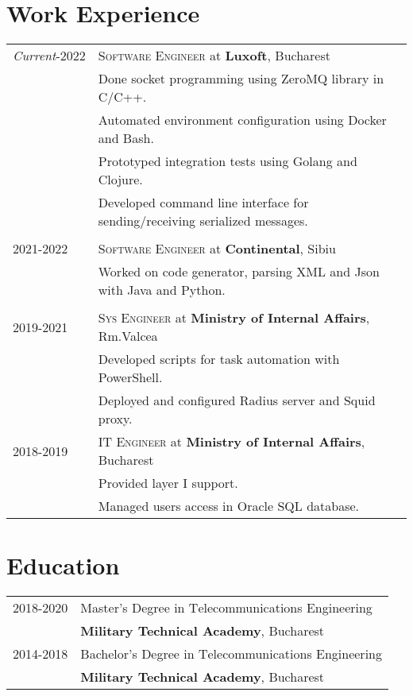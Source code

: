\documentclass[a4paper,12pt]{article}
\newcommand{\tsc}{\textsc}
\begin{document}
\section{Work Experience}
    \begin{tabular}{p{3.1cm}|l}
        \raggedleft\emph{Current}\tsc{-2022}
        &\tsc{Software Engineer} at \textbf{Luxoft}, Bucharest\\
        &\footnotesize{Done socket programming using ZeroMQ library in C/C++.}\\
        &\footnotesize{Automated environment configuration using Docker and Bash.}\\
        &\footnotesize{Prototyped integration tests using Golang and Clojure.}\\
        &\footnotesize{Developed command line interface for sending/receiving serialized messages.}\\
        \multicolumn{2}{c}{}\\
        \raggedleft\tsc{2021-2022}
        &\tsc{Software Engineer} at \textbf{Continental}, Sibiu\\
        &\footnotesize{Worked on code generator, parsing XML and Json with Java and Python.}\\
        \multicolumn{2}{c}{}\\
        \raggedleft\tsc{2019-2021} 
          &\tsc{Sys Engineer} at \textbf{Ministry of Internal Affairs}, Rm.Valcea\\
        &\footnotesize{Developed scripts for task automation with PowerShell.}\\
        &\footnotesize{Deployed and configured Radius server and Squid proxy.}\\
        \raggedleft\tsc{2018-2019} 
        &\tsc{IT Engineer} at \textbf{Ministry of Internal Affairs}, Bucharest\\
        &\footnotesize{Provided layer I support.}\\
        &\footnotesize{Managed users access in Oracle SQL database.}\\
    \end{tabular}

\section{Education}
\begin{tabular}{p{3.1cm}|l}
    \raggedleft\tsc{2018-2020}&Master's Degree in \tsc{T}elecommunications \tsc{E}ngineering\\
        & \textbf{Military Technical Academy}, Bucharest\\
    \raggedleft\tsc{2014-2018}&Bachelor's Degree in \tsc{T}elecommunications \tsc{E}ngineering\\
        &\textbf{Military Technical Academy}, Bucharest\\
\end{tabular}
\end{document}
